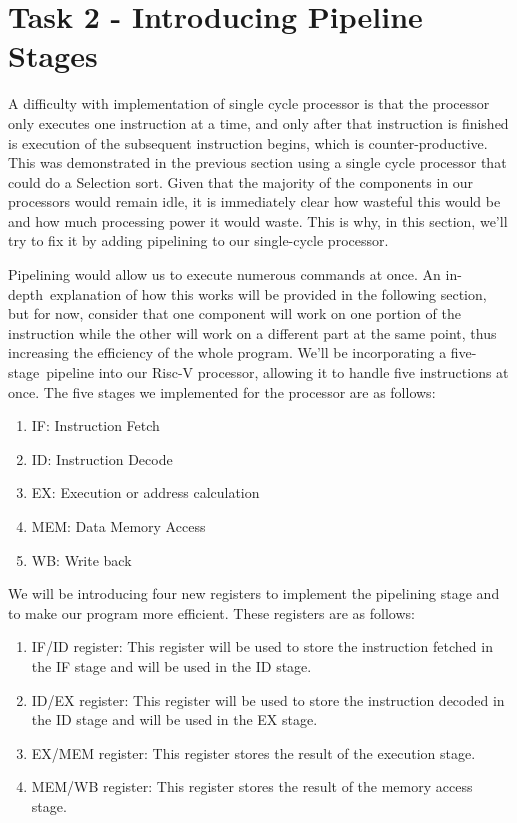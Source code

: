 \documentclass{article}
\begin{document}
\newpage

\section{Task 2 - Introducing Pipeline Stages}

A difficulty with implementation of single cycle processor is that the processor only executes one instruction at a time, and only after that instruction is finished is execution of the subsequent instruction begins, which is counter-productive. This was demonstrated in the previous section using a single cycle processor that could do a Selection sort. Given that the majority of the components in our processors would remain idle, it is immediately clear how wasteful this would be and how much processing power it would waste. This is why, in this section, we'll try to fix it by adding pipelining to our single-cycle processor.

Pipelining would allow us to execute numerous commands at once. An in-depth explanation of how this works will be provided in the following section, but for now, consider that one component will work on one portion of the instruction while the other will work on a different part at the same point, thus increasing the efficiency of the whole program. We'll be incorporating a five-stage pipeline into our Risc-V processor, allowing it to handle five instructions at once. The five stages we implemented for the processor are as follows:

\begin{enumerate}
    \item IF: Instruction Fetch
    \item ID: Instruction Decode 
    \item EX: Execution or address calculation
    \item MEM: Data Memory Access
    \item WB: Write back

\end{enumerate}

We will be introducing four new registers to implement the pipelining stage and to make our program more efficient. These registers are as follows:

\begin{enumerate}
    \item IF/ID register: This register will be used to store the instruction fetched in the IF stage and will be used in the ID stage.
    \item ID/EX register: This register will be used to store the instruction decoded in the ID stage and will be used in the EX stage.
    \item EX/MEM register: This register stores the result of the execution stage.
    \item MEM/WB register: This register stores the result of the memory access stage.
\end{enumerate}
\end{document}
